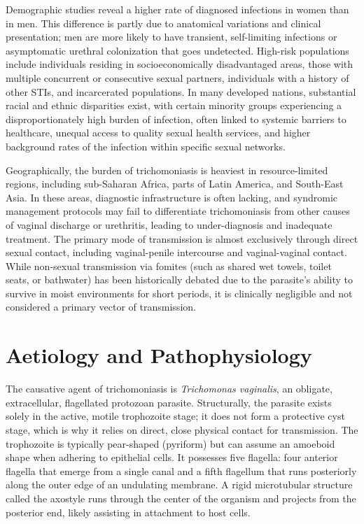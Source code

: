 Demographic studies reveal a higher rate of diagnosed infections in women than in men. This difference is partly due to anatomical variations and clinical presentation; men are more likely to have transient, self-limiting infections or asymptomatic urethral colonization that goes undetected. High-risk populations include individuals residing in socioeconomically disadvantaged areas, those with multiple concurrent or consecutive sexual partners, individuals with a history of other STIs, and incarcerated populations. In many developed nations, substantial racial and ethnic disparities exist, with certain minority groups experiencing a disproportionately high burden of infection, often linked to systemic barriers to healthcare, unequal access to quality sexual health services, and higher background rates of the infection within specific sexual networks.

Geographically, the burden of trichomoniasis is heaviest in resource-limited regions, including sub-Saharan Africa, parts of Latin America, and South-East Asia. In these areas, diagnostic infrastructure is often lacking, and syndromic management protocols may fail to differentiate trichomoniasis from other causes of vaginal discharge or urethritis, leading to under-diagnosis and inadequate treatment. The primary mode of transmission is almost exclusively through direct sexual contact, including vaginal-penile intercourse and vaginal-vaginal contact. While non-sexual transmission via fomites (such as shared wet towels, toilet seats, or bathwater) has been historically debated due to the parasite's ability to survive in moist environments for short periods, it is clinically negligible and not considered a primary vector of transmission.

\section*{Aetiology and Pathophysiology}
The causative agent of trichomoniasis is \textit{Trichomonas vaginalis}, an obligate, extracellular, flagellated protozoan parasite. Structurally, the parasite exists solely in the active, motile trophozoite stage; it does not form a protective cyst stage, which is why it relies on direct, close physical contact for transmission. The trophozoite is typically pear-shaped (pyriform) but can assume an amoeboid shape when adhering to epithelial cells. It possesses five flagella: four anterior flagella that emerge from a single canal and a fifth flagellum that runs posteriorly along the outer edge of an undulating membrane. A rigid microtubular structure called the axostyle runs through the center of the organism and projects from the posterior end, likely assisting in attachment to host cells.

